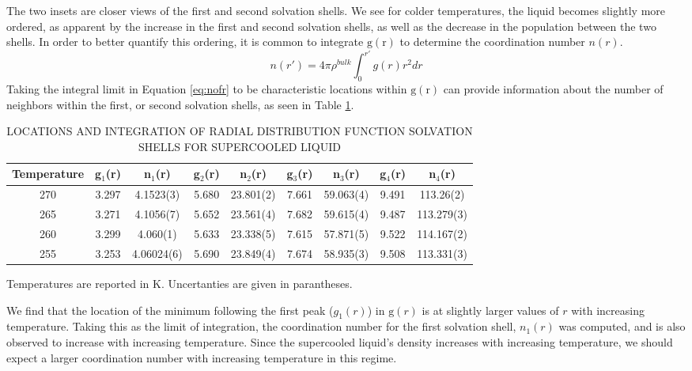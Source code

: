 The two insets are closer views of the first and second solvation
shells. We see for colder temperatures, the liquid becomes slightly
more ordered, as apparent by the increase in the first and second
solvation shells, as well as the decrease in the population between
the two shells. In order to better quantify this ordering, it is
common to integrate $\mathrm{g}(\mathrm{r})$ to determine the
coordination number $n(r)$.
\begin{equation}\label{eq:nofr}
n(r') = 4 \pi \rho^{bulk} \int_0^{r'} g(r)r^2dr
\end{equation}
Taking the integral limit in Equation \eqref{eq:nofr} to be
characteristic locations within $\mathrm{g}(\mathrm{r})$ can provide
information about the number of neighbors within the first, or second
solvation shells, as seen in Table \ref{tab:gofr}.

\begin{table}[h] \centering \caption{LOCATIONS AND INTEGRATION OF
    RADIAL DISTRIBUTION FUNCTION SOLVATION SHELLS FOR SUPERCOOLED LIQUID\label{tab:gofr}}
\begin{tabular}{ccccccccc}
\hline
\hline
 Temperature & g$_1$(r) & n$_1$(r) & g$_2$(r) & n$_2$(r) & g$_3$(r) &
                                                                      n$_3$(r) & g$_4$(r) & n$_4$(r)\\
\hline
270 & 3.297 &4.1523(3) & 5.680 & 23.801(2) & 7.661 & 59.063(4) & 9.491
  & 113.26(2) \\
265 & 3.271 & 4.1056(7) & 5.652 & 23.561(4) & 7.682 & 59.615(4) &
                                                                  9.487
             & 113.279(3) \\
260 & 3.299 & 4.060(1) & 5.633 & 23.338(5) & 7.615 & 57.871(5) & 9.522
  & 114.167(2) \\
255 & 3.253 & 4.06024(6) & 5.690 & 23.849(4) & 7.674 & 58.935(3) &
                                                                   9.508
             & 113.331(3)  \\
\hline
\hline
\end{tabular}
\begin{flushleft}
Temperatures are reported in K. Uncertanties are given in parantheses.
\end{flushleft}
\end{table}

We find that the location of the minimum following the first peak
($g_1(r)$) in $\mathrm{g}(r)$ is at slightly larger values of $r$ with
increasing temperature. Taking this as the limit of integration, the
coordination number for the first solvation shell, $n_1(r)$ was
computed, and is also observed to increase with increasing
temperature. Since the supercooled liquid's density increases with
increasing temperature, we should expect a larger coordination number
with increasing temperature in this regime. 


